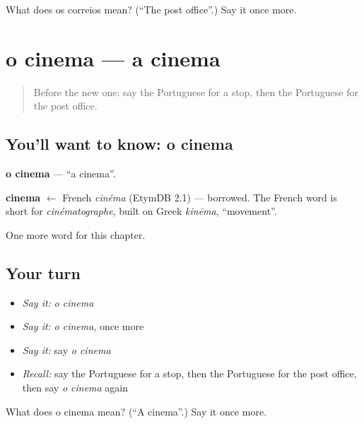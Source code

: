 \begin{tcolorbox}[breakable,colback=teal!4,colframe=teal!35!black,title={Before you move on}]
What does os correios mean? (\textquotedblleft{}The post office\textquotedblright{}.) Say it once more.
\end{tcolorbox}
\section[o cinema]{o cinema — a cinema}

\label{lesson:PT-C85-cinema}



\begin{quote}
Before the new one: say the Portuguese for a stop, then the Portuguese for the post office.
\end{quote}

\subsection*{You'll want to know: o cinema}
\textbf{o cinema} — \textquotedblleft{}a cinema\textquotedblright{}.

\begin{cousinweb}
\textbf{cinema} $\leftarrow$ French \emph{cinéma} (EtymDB 2.1) — borrowed. The French word is short for \emph{cinématographe}, built on Greek \emph{kinēma}, \textquotedblleft{}movement\textquotedblright{}.
\end{cousinweb}

\begin{grammarlens}[title={What you've built}]
One more word for this chapter.
\end{grammarlens}

\subsection*{Your turn}
\begin{itemize}
\raggedright
  \item \emph{Say it:} \emph{o cinema}
  \item \emph{Say it:} \emph{o cinema}, once more
  \item \emph{Say it:} say \emph{o cinema}
  \item \emph{Recall:} say the Portuguese for a stop, then the Portuguese for the post office, then say \emph{o cinema} again
\end{itemize}

\begin{tcolorbox}[breakable,colback=teal!4,colframe=teal!35!black,title={Before you move on}]
What does o cinema mean? (\textquotedblleft{}A cinema\textquotedblright{}.) Say it once more.
\end{tcolorbox}
